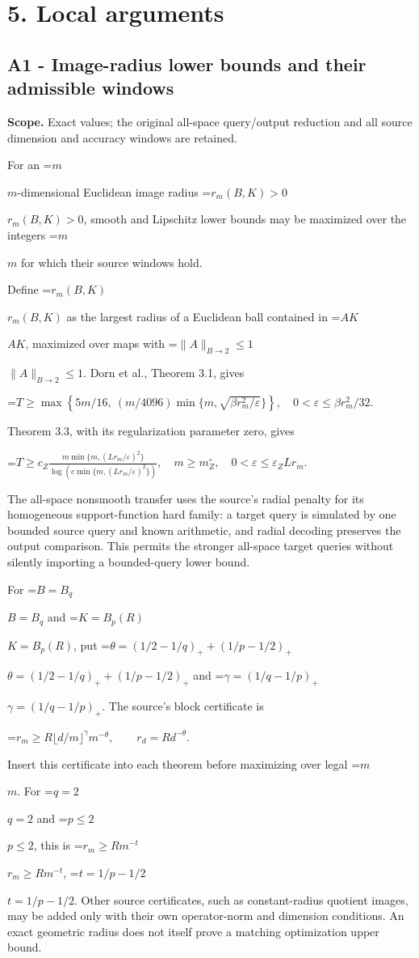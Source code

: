 \documentclass[10pt,a4paper]{article}
\newcommand{\AtlasMath}[1]{\par\begingroup\centering\setbox0=\hbox{$\displaystyle #1$}\ifdim\wd0>1.4\linewidth\typeout{ATLAS WIDE FORMULA: \the\wd0}\fi\ifdim\wd0>\linewidth\resizebox{\linewidth}{!}{\box0}\else\box0\fi\par\endgroup}
\newcommand{\AtlasInlineMath}[1]{\begingroup\setbox0=\hbox{$#1$}\ifdim\wd0>.4\linewidth\endgroup\AtlasMath{#1}\else\endgroup$#1$\fi}
\begin{document}
\section{5. Local arguments}
\subsection{A1 - Image-radius lower bounds and their admissible windows}
\textbf{Scope.} Exact values; the original all-space query/output reduction and all source dimension and accuracy windows are retained.

For an \AtlasInlineMath{m}-dimensional Euclidean image radius \AtlasInlineMath{r_m(B,K)>0}, smooth and Lipschitz lower bounds may be maximized over the integers \AtlasInlineMath{m} for which their source windows hold.

Define \AtlasInlineMath{r_m(B,K)} as the largest radius of a Euclidean ball contained in \AtlasInlineMath{AK}, maximized over maps with \AtlasInlineMath{\|A\|_{B\to2}\le1}. Dorn et al., Theorem 3.1, gives

\AtlasMath{T\ge\max\left\{5m/16,\ (m/4096)\min\{m,\sqrt{\beta r_m^2/\varepsilon}\}\right\},\quad0<\varepsilon\le\beta r_m^2/32.}

Theorem 3.3, with its regularization parameter zero, gives

\AtlasMath{T\ge c_Z\frac{m\min\{m,(Lr_m/\varepsilon)^2\}}{\log(e\min\{m,(Lr_m/\varepsilon)^2\})},\quad m\ge m_Z^\circ,\quad0<\varepsilon\le\varepsilon_ZLr_m.}

The all-space nonsmooth transfer uses the source's radial penalty for its homogeneous support-function hard family: a target query is simulated by one bounded source query and known arithmetic, and radial decoding preserves the output comparison. This permits the stronger all-space target queries without silently importing a bounded-query lower bound.

For \AtlasInlineMath{B=B_q} and \AtlasInlineMath{K=B_p(R)}, put \AtlasInlineMath{\theta=(1/2-1/q)_++(1/p-1/2)_+} and \AtlasInlineMath{\gamma=(1/q-1/p)_+}. The source's block certificate is

\AtlasMath{r_m\ge R\lfloor d/m\rfloor^\gamma m^{-\theta},\qquad r_d=Rd^{-\theta}.}

Insert this certificate into each theorem before maximizing over legal \AtlasInlineMath{m}. For \AtlasInlineMath{q=2} and \AtlasInlineMath{p\le2}, this is \AtlasInlineMath{r_m\ge Rm^{-t}}, \AtlasInlineMath{t=1/p-1/2}. Other source certificates, such as constant-radius quotient images, may be added only with their own operator-norm and dimension conditions. An exact geometric radius does not itself prove a matching optimization upper bound.
\end{document}
